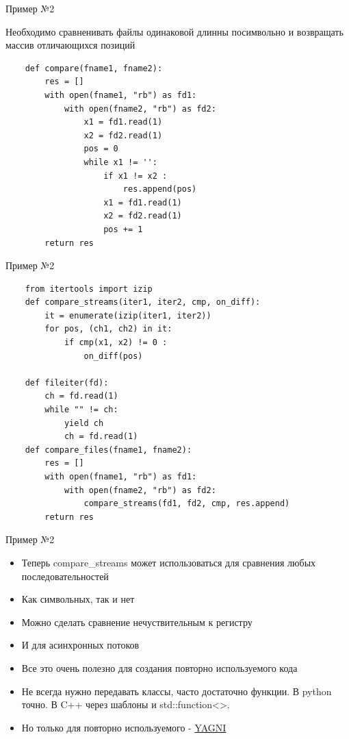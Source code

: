 \documentclass{article}
\begin{document}
\begin{center} Пример №2 \end{center}
Необходимо сравненивать файлы одинаковой длинны посимвольно 
    и возвращать массив отличающихся позиций
\begin{lstlisting}
    def compare(fname1, fname2):
        res = []
        with open(fname1, "rb") as fd1:
            with open(fname2, "rb") as fd2:
                x1 = fd1.read(1)
                x2 = fd2.read(1)
                pos = 0
                while x1 != '':
                    if x1 != x2 :
                        res.append(pos)
                    x1 = fd1.read(1)
                    x2 = fd2.read(1)
                    pos += 1
        return res
\end{lstlisting}
\newpage

\begin{center} Пример №2 \end{center}
\begin{lstlisting}
    from itertools import izip
    def compare_streams(iter1, iter2, cmp, on_diff):
        it = enumerate(izip(iter1, iter2))
        for pos, (ch1, ch2) in it:
            if cmp(x1, x2) != 0 : 
                on_diff(pos)

    def fileiter(fd):
        ch = fd.read(1)
        while "" != ch:
            yield ch
            ch = fd.read(1)
    def compare_files(fname1, fname2):
        res = []
        with open(fname1, "rb") as fd1:
            with open(fname2, "rb") as fd2:
                compare_streams(fd1, fd2, cmp, res.append)
        return res
\end{lstlisting}
\newpage

\begin{center} Пример №2 \end{center}
\begin{itemize}
    \item Теперь compare\_streams может использоваться для сравнения любых последовательностей
    \item Как символьных, так и нет
    \item Можно сделать сравнение нечуствительным к регистру
    \item И для асинхронных потоков
    \item Все это очень полезно для создания повторно используемого кода
    \item Не всегда нужно передавать классы, часто достаточно функции. 
            В python точно. В C++ через шаблоны и std::function<>.
    \item Но только для повторно используемого - 
            \href{http://ru.wikipedia.org/wiki/%D0%9F%D1%80%D0%B8%D0%BD%D1%86%D0%B8%D0%BF_YAGNI}{YAGNI}
\end{itemize}
\newpage
\end{document}
